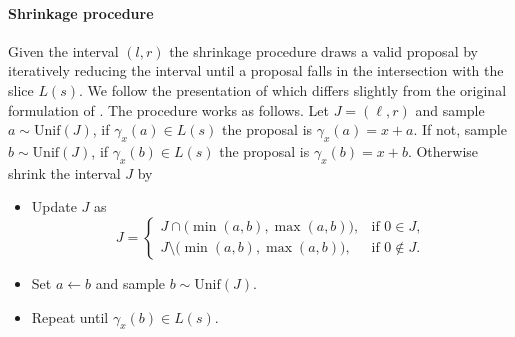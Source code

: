 \paragraph{Shrinkage procedure} 
Given the interval $(l,r)$ the shrinkage procedure draws a valid proposal by iteratively reducing the interval until a proposal falls in the intersection with the slice $L(s)$. We follow the presentation of \citet{durmus2026geodesic} which differs slightly from the original formulation of \citet{Neal2003}. The procedure works as follows. Let $J = (\ell,r)$ and sample $a\sim \mathrm{Unif}(J)$, if $\gamma_x(a)\in L(s)$ the proposal is $\gamma_x(a) = x+a$. If not, sample  $b\sim \mathrm{Unif}(J)$, if $\gamma_x(b)\in L(s)$ the proposal is $\gamma_x(b) = x+b$. Otherwise shrink the interval $J$ by
\begin{itemize}    
    \item Update $J$ as
    \begin{equation*}
        J =
        \begin{cases} 
        J \cap \bigl(\min(a,b), \max(a,b)\bigr), & \text{if } 0 \in J, \\
        J \setminus \bigl(\min(a,b), \max(a,b)\bigr), & \text{if } 0 \notin J.
        \end{cases}        
    \end{equation*}    
    \item Set $a\gets b$ and  sample $b\sim \mathrm{Unif}(J)$.  
    \item Repeat until $\gamma_x(b) \in L(s)$.
\end{itemize}


